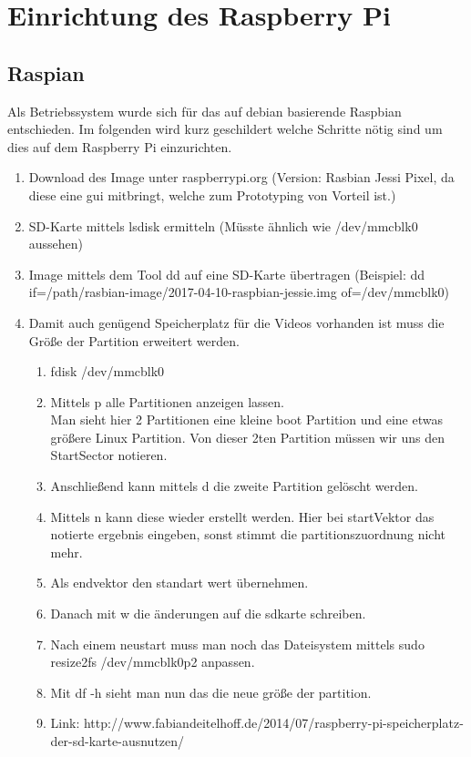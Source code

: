 \section{Einrichtung des Raspberry Pi}
\label{sec:Einrichtung_Raspi}
\subsection{Raspian}

Als Betriebssystem wurde sich für das auf debian basierende Raspbian entschieden. Im folgenden wird kurz geschildert welche Schritte nötig sind um dies auf dem Raspberry Pi einzurichten.



\begin{enumerate}
  \item Download des Image unter raspberrypi.org (Version: Rasbian Jessi Pixel, da diese eine gui mitbringt, welche zum Prototyping von Vorteil ist.)
  \item SD-Karte mittels lsdisk ermitteln (Müsste ähnlich wie /dev/mmcblk0 aussehen)
  \item Image mittels dem Tool dd auf eine SD-Karte übertragen (Beispiel: dd if=/path/rasbian-image/2017-04-10-raspbian-jessie.img of=/dev/mmcblk0)
  \item Damit auch genügend Speicherplatz für die Videos vorhanden ist muss die Größe der Partition erweitert werden. \\
  \begin {enumerate}
    \item fdisk /dev/mmcblk0
    \item Mittels p alle Partitionen anzeigen lassen. \\ Man sieht hier 2 Partitionen eine kleine boot Partition und eine etwas größere Linux Partition. Von dieser 2ten   Partition müssen wir uns den StartSector notieren. 
    \item Anschließend kann mittels d die zweite Partition gelöscht werden. 
    \item Mittels n kann diese wieder erstellt werden. Hier bei startVektor das notierte ergebnis eingeben, sonst stimmt die partitionszuordnung nicht mehr. 
    \item Als endvektor den standart wert übernehmen.
    \item Danach mit w die änderungen auf die sdkarte schreiben.
    \item Nach einem neustart muss man noch das Dateisystem mittels sudo resize2fs /dev/mmcblk0p2 anpassen.
    \item Mit df -h sieht man nun das die neue größe der partition.
    \item Link: http://www.fabiandeitelhoff.de/2014/07/raspberry-pi-speicherplatz-der-sd-karte-ausnutzen/
  \end{enumerate}
\end{enumerate}



